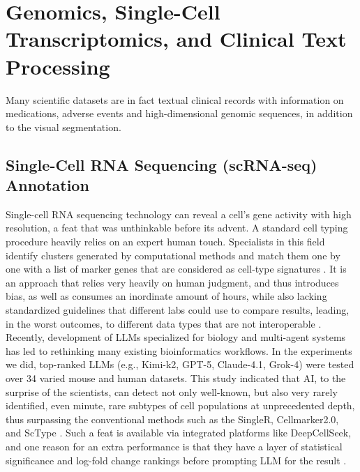 \documentclass[10pt, conference, letterpaper]{IEEEtran}
\begin{document}
\section{Genomics, Single-Cell Transcriptomics, and Clinical Text Processing}
\label{sec:genomics}
Many scientific datasets are in fact textual clinical records with information on medications, adverse events and high-dimensional genomic sequences, in addition to the visual segmentation.

\subsection{Single-Cell RNA Sequencing (scRNA-seq) Annotation}
Single-cell RNA sequencing technology can reveal a cell's gene activity with high resolution, a feat that was unthinkable before its advent.
A standard cell typing procedure heavily relies on an expert human touch.
Specialists in this field identify clusters generated by computational methods and match them one by one with a list of marker genes that are considered as cell-type signatures \cite{ref22}. It is an approach that relies very heavily on human judgment, and thus introduces bias, as well as consumes an inordinate amount of hours, while also lacking standardized guidelines that different labs could use to compare results, leading, in the worst outcomes, to different data types that are not interoperable \cite{ref22}.
Recently, development of LLMs specialized for biology and multi-agent systems has led to rethinking many existing bioinformatics workflows. In the experiments we did, top-ranked LLMs (e.g., Kimi-k2, GPT-5, Claude-4.1, Grok-4) were tested over 34 varied mouse and human datasets.
This study indicated that AI, to the surprise of the scientists, can detect not only well-known, but also very rarely identified, even minute, rare subtypes of cell populations at unprecedented depth, thus surpassing the conventional methods such as the SingleR, Cellmarker2.0, and ScType \cite{ref22}. Such a feat is available via integrated platforms like DeepCellSeek, and one reason for an extra performance is that they have a layer of statistical significance and log-fold change rankings before prompting LLM for the result \cite{ref22}.
\end{document}
